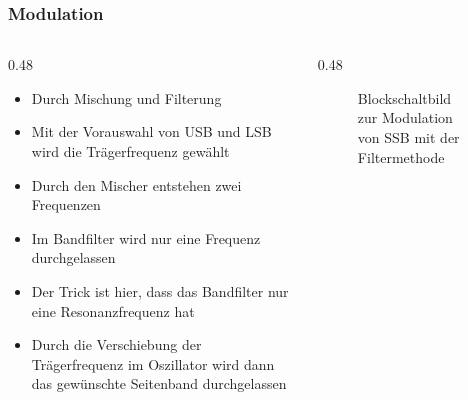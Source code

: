 \begin{frame}
\end{frame}

\begin{frame}
    \frametitle{Modulation}
    \begin{columns}
        \begin{column}{0.48\textwidth}
            \small
            \begin{itemize}
                \item Durch Mischung und Filterung
                \item Mit der Vorauswahl von USB und LSB wird die Trägerfrequenz gewählt
                \item Durch den Mischer entstehen zwei Frequenzen
                \item Im Bandfilter wird nur eine Frequenz durchgelassen
                \item Der Trick ist hier, dass das Bandfilter nur eine Resonanzfrequenz hat
                \item Durch die Verschiebung der Trägerfrequenz im Oszillator wird dann das gewünschte Seitenband durchgelassen
            \end{itemize}
        \end{column}
        \begin{column}{0.48\textwidth}
            \begin{figure}
                \caption{\scriptsize Blockschaltbild zur Modulation von SSB mit der Filtermethode}
                \label{e_ssb_modulation}
            \end{figure}
        \end{column}
    \end{columns}
\end{frame}

